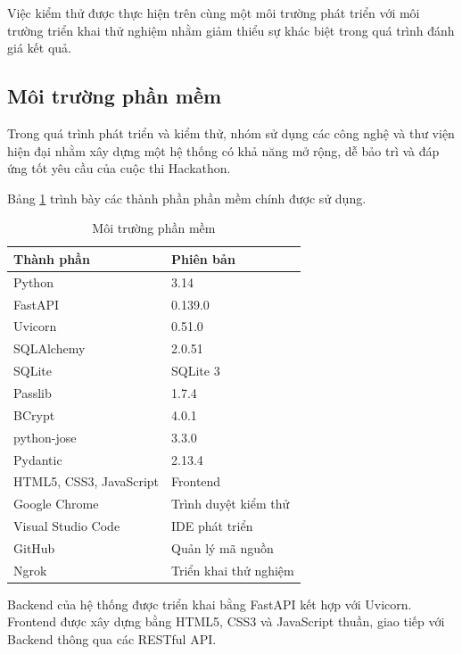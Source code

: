 Việc kiểm thử được thực hiện trên cùng một môi trường phát triển với môi trường triển khai thử nghiệm nhằm giảm thiểu sự khác biệt trong quá trình đánh giá kết quả.


\subsection{Môi trường phần mềm}

Trong quá trình phát triển và kiểm thử, nhóm sử dụng các công nghệ và thư viện hiện đại nhằm xây dựng một hệ thống có khả năng mở rộng, dễ bảo trì và đáp ứng tốt yêu cầu của cuộc thi Hackathon.

Bảng \ref{tab:software_environment} trình bày các thành phần phần mềm chính được sử dụng.

\begin{table}[H]
	\centering
	\caption{Môi trường phần mềm}
	\label{tab:software_environment}
	\renewcommand{\arraystretch}{1.3}
	\begin{tabular}{|p{5cm}|p{8cm}|}
		\hline
		\textbf{Thành phần} & \textbf{Phiên bản} \\
		\hline
		Python & 3.14 \\
		\hline
		FastAPI & 0.139.0 \\
		\hline
		Uvicorn & 0.51.0 \\
		\hline
		SQLAlchemy & 2.0.51 \\
		\hline
		SQLite & SQLite 3 \\
		\hline
		Passlib & 1.7.4 \\
		\hline
		BCrypt & 4.0.1 \\
		\hline
		python-jose & 3.3.0 \\
		\hline
		Pydantic & 2.13.4 \\
		\hline
		HTML5, CSS3, JavaScript & Frontend \\
		\hline
		Google Chrome & Trình duyệt kiểm thử \\
		\hline
		Visual Studio Code & IDE phát triển \\
		\hline
		GitHub & Quản lý mã nguồn \\
		\hline
		Ngrok & Triển khai thử nghiệm \\
		\hline
	\end{tabular}
\end{table}

Backend của hệ thống được triển khai bằng FastAPI kết hợp với Uvicorn. Frontend được xây dựng bằng HTML5, CSS3 và JavaScript thuần, giao tiếp với Backend thông qua các RESTful API.

